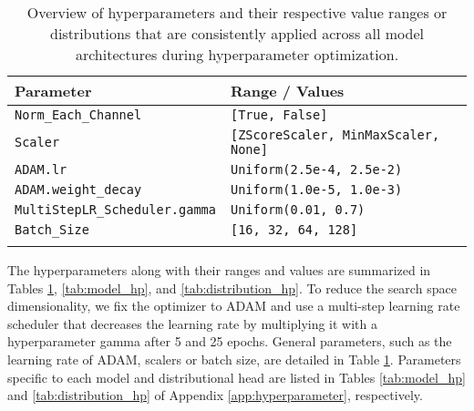 \documentclass[a4paper,oneside,bibliography=totoc]{scrbook}
\begin{document}
\begin{table}%
\caption{Overview of hyperparameters and their respective value ranges or distributions that are consistently applied across all model architectures during hyperparameter optimization.}
\centering
\begin{tabular}{p{6cm}p{8cm}}
\hline
\textbf{Parameter} & \textbf{Range / Values} \\
\hline
\texttt{Norm\_Each\_Channel} & \texttt{[True, False]} \\
\texttt{Scaler} & \texttt{[ZScoreScaler, MinMaxScaler, None]} \\
\texttt{ADAM.lr} & \texttt{Uniform(2.5e-4, 2.5e-2)}\\
\texttt{ADAM.weight\_decay} & \texttt{Uniform(1.0e-5, 1.0e-3)} \\
\texttt{MultiStepLR\_Scheduler.gamma} & \texttt{Uniform(0.01, 0.7)} \\
\texttt{Batch\_Size} & \texttt{[16, 32, 64, 128]} \\
\hline
\label{tab:general_hp}
\end{tabular}
\end{table}
The hyperparameters along with their ranges and values are summarized in Tables \ref{tab:general_hp}, \ref{tab:model_hp}, and \ref{tab:distribution_hp}. To reduce the search space dimensionality, we fix the optimizer to ADAM \cite{kingma_adam_2014} and use a multi-step learning rate scheduler that decreases the learning rate by multiplying it with a hyperparameter gamma after 5 and 25 epochs.
General parameters, such as the learning rate of ADAM, scalers or batch size, are detailed in Table \ref{tab:general_hp}.
Parameters specific to each model and distributional head are listed in Tables \ref{tab:model_hp} and \ref{tab:distribution_hp} of Appendix \ref{app:hyperparameter}, respectively.
\end{document}
